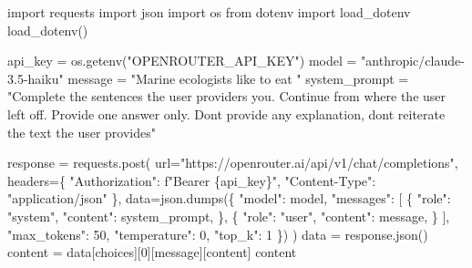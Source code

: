 \documentclass[
  letterpaper,
  DIV=11,
  numbers=noendperiod]{scrreprt}
\newenvironment{Shaded}{\begin{snugshade}}{\end{snugshade}}
\newcommand{\DecValTok}[1]{\textcolor[rgb]{0.68,0.00,0.00}{#1}}
\newcommand{\ImportTok}[1]{\textcolor[rgb]{0.00,0.46,0.62}{#1}}
\newcommand{\NormalTok}[1]{\textcolor[rgb]{0.00,0.23,0.31}{#1}}
\newcommand{\OperatorTok}[1]{\textcolor[rgb]{0.37,0.37,0.37}{#1}}
\newcommand{\SpecialCharTok}[1]{\textcolor[rgb]{0.37,0.37,0.37}{#1}}
\newcommand{\SpecialStringTok}[1]{\textcolor[rgb]{0.13,0.47,0.30}{#1}}
\newcommand{\StringTok}[1]{\textcolor[rgb]{0.13,0.47,0.30}{#1}}
\begin{document}
\begin{Shaded}
\begin{Highlighting}[]
\ImportTok{import}\NormalTok{ requests}
\ImportTok{import}\NormalTok{ json}
\ImportTok{import}\NormalTok{ os}
\ImportTok{from}\NormalTok{ dotenv }\ImportTok{import}\NormalTok{ load\_dotenv}
\NormalTok{load\_dotenv()}

\NormalTok{api\_key }\OperatorTok{=}\NormalTok{ os.getenv(}\StringTok{"OPENROUTER\_API\_KEY"}\NormalTok{)}
\NormalTok{model }\OperatorTok{=} \StringTok{"anthropic/claude{-}3.5{-}haiku"}
\NormalTok{message }\OperatorTok{=} \StringTok{"Marine ecologists like to eat "}
\NormalTok{system\_prompt }\OperatorTok{=} \StringTok{"Complete the sentences the user providers you. Continue from where the user left off. Provide one answer only. Don\textquotesingle{}t provide any explanation, don\textquotesingle{}t reiterate the text the user provides"}

\NormalTok{response }\OperatorTok{=}\NormalTok{ requests.post(}
\NormalTok{  url}\OperatorTok{=}\StringTok{"https://openrouter.ai/api/v1/chat/completions"}\NormalTok{,}
\NormalTok{  headers}\OperatorTok{=}\NormalTok{\{}
    \StringTok{"Authorization"}\NormalTok{: }\SpecialStringTok{f"Bearer }\SpecialCharTok{\{}\NormalTok{api\_key}\SpecialCharTok{\}}\SpecialStringTok{"}\NormalTok{,}
    \StringTok{"Content{-}Type"}\NormalTok{: }\StringTok{"application/json"}
\NormalTok{  \},}
\NormalTok{  data}\OperatorTok{=}\NormalTok{json.dumps(\{}
    \StringTok{"model"}\NormalTok{: model,}
    \StringTok{"messages"}\NormalTok{: [}
\NormalTok{      \{}
        \StringTok{"role"}\NormalTok{: }\StringTok{"system"}\NormalTok{,}
        \StringTok{"content"}\NormalTok{: system\_prompt,}
\NormalTok{      \},}
\NormalTok{      \{}
        \StringTok{"role"}\NormalTok{: }\StringTok{"user"}\NormalTok{,}
        \StringTok{"content"}\NormalTok{: message,}
\NormalTok{      \}}
\NormalTok{    ],}
    \StringTok{"max\_tokens"}\NormalTok{: }\DecValTok{50}\NormalTok{,}
    \StringTok{"temperature"}\NormalTok{: }\DecValTok{0}\NormalTok{,}
    \StringTok{"top\_k"}\NormalTok{: }\DecValTok{1}
\NormalTok{  \})}
\NormalTok{)}
\NormalTok{data }\OperatorTok{=}\NormalTok{ response.json()}
\NormalTok{content }\OperatorTok{=}\NormalTok{ data[}\StringTok{\textquotesingle{}choices\textquotesingle{}}\NormalTok{][}\DecValTok{0}\NormalTok{][}\StringTok{\textquotesingle{}message\textquotesingle{}}\NormalTok{][}\StringTok{\textquotesingle{}content\textquotesingle{}}\NormalTok{]}
\NormalTok{content}
\end{Highlighting}
\end{Shaded}
\end{document}
